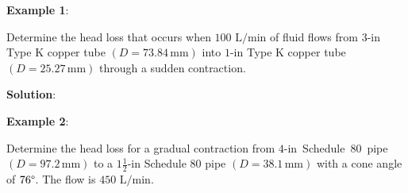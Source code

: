 \documentclass[10pt, oneside]{amsart}
\begin{document}
\begin{multicols}{2}
\newpage
\raggedright



	\textbf{Example 1}:
	\par\medskip

	Determine the head loss that occurs when $100\text{ L/min}$ of fluid flows from $3\text{-in}$ Type K copper tube $(D=73.84\,\text{mm})$ into
	$1\text{-in}$ Type K copper tube $(D=25.27\,\text{mm})$ through a sudden contraction.

	\textbf{Solution}:\\


 	\vfill

\columnbreak



\textbf{Example 2}:

Determine the head loss for a gradual contraction from $4\text{-in}$~Schedule~$80$~pipe $(D=97.2\,\text{mm})$ to a
$1\tfrac{1}{2}\text{-in}$ Schedule $80$ pipe $(D=38.1\,\text{mm})$ with a cone angle of $76\degree$.
\lb The flow is $450\text{ L/min}$.


\end{multicols}
\end{document}
